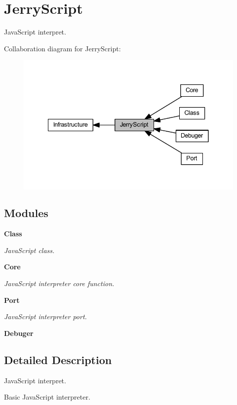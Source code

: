 \section{Jerry\+Script}
\label{group___jerry_script}


Java\+Script interpret.  


Collaboration diagram for Jerry\+Script\+:\nopagebreak
\begin{figure}[H]
\begin{center}
\leavevmode
\includegraphics[width=341pt]{group___jerry_script}
\end{center}
\end{figure}
\subsection*{Modules}
\begin{DoxyCompactItemize}
\item 
\textbf{ Class}
\begin{DoxyCompactList}\small\item\em Java\+Script class. \end{DoxyCompactList}\item 
\textbf{ Core}
\begin{DoxyCompactList}\small\item\em Java\+Script interpreter core function. \end{DoxyCompactList}\item 
\textbf{ Port}
\begin{DoxyCompactList}\small\item\em Java\+Script interpreter port. \end{DoxyCompactList}\item 
\textbf{ Debuger}
\end{DoxyCompactItemize}


\subsection{Detailed Description}
Java\+Script interpret. 

Basic Java\+Script interpreter.